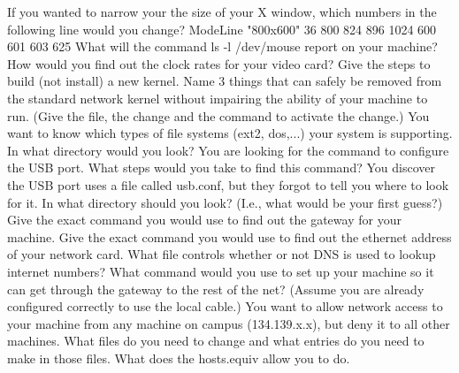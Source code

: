 \vskip 0.5in
\ques
If you wanted to narrow your the size of your X window,
which numbers in the following line would you change?
\break
{\ltt{}ModeLine "800x600"     36     800  824  896 1024   600  601  603  625}
\vskip 0.5in
What will the command {\ltt{}ls -l /dev/mouse} report on
your machine?
\vskip 0.5in
How would you find out the clock rates for your video card?
\vskip 0.8in
\ques
Give the steps to build (not install) a new kernel.
\vskip 1.8in
Name 3 things that can safely be removed from the standard
network kernel without impairing the ability of your
machine to run.
(Give the file, the change and the command to activate the change.)
\vfill\eject
\ques
You want to know which types of file systems (ext2, dos,...) your system
is supporting.
In what directory would you look?
\vskip 0.4in
You are looking for the command to configure the USB port.
What steps would you take to find this command?
\vskip 1.0in
You discover the USB port uses a file called {\ltt{}usb.conf},
but they forgot to tell you where to look for it.
In what directory should you look?
(I.e., what would be your first guess?)
\vskip 0.4in
\ques
Give the exact command you would use to find
out the gateway for your machine.
\vskip 0.5in
Give the exact command you would use to find out
the ethernet address of your network card.
\vskip 0.5in
What file controls whether or not DNS is used to
lookup internet numbers?
\vskip 0.5in
\ques
What command would you use to set up your machine so
it can get through the gateway to the rest of the net?
(Assume you are already configured correctly to use the
local cable.)
\vskip 0.5in
You want to allow network access to your machine from any
machine on campus (134.139.x.x), but deny it to all other machines.
What files do you need to change and what entries do you need
to make in those files.
\vskip 1.8in
What does the {\ltt{}hosts.equiv} allow you to do.
\vskip 0.8in
\bye
